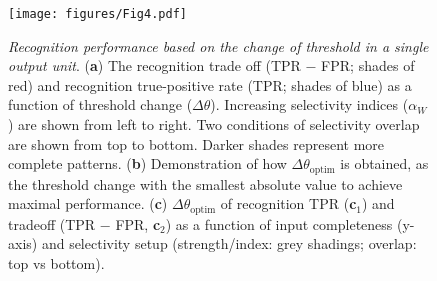 \begin{figure}[!ht]
    \centering
    \texttt{[image: figures/Fig4.pdf]}
    \caption{
    \textit{Recognition performance based on the change of threshold in a single output unit}.
    (\textbf{a})
        The recognition trade off (TPR $-$ FPR; shades of red)
        and recognition true-positive rate (TPR; shades of blue)
        as a function of threshold change ($\Delta\theta$).
        Increasing selectivity indices ($\alpha_W$) are shown from left to right.
        Two conditions of selectivity overlap are shown from top to bottom.
        Darker shades represent more complete patterns.
    (\textbf{b})
        Demonstration of how $\Delta \theta_{\mathrm{optim}}$ is obtained,
        as the threshold change with the smallest absolute value to achieve maximal performance.
    (\textbf{c})
        $\Delta \theta_{\mathrm{optim}}$ of recognition TPR (\textbf{c}$_1$)
        and tradeoff (TPR $-$ FPR, \textbf{c}$_2$)
        as a function of input completeness (y-axis)
        and selectivity setup (strength/index: grey shadings; overlap: top vs bottom).
    }
    \label{fig:ffwd-recog-perf}
\end{figure}
